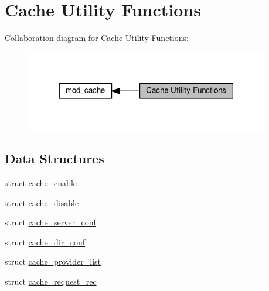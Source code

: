 \hypertarget{group__Cache__util}{}\section{Cache Utility Functions}
\label{group__Cache__util}
Collaboration diagram for Cache Utility Functions\+:
\nopagebreak
\begin{figure}[H]
\begin{center}
\leavevmode
\includegraphics[width=302pt]{group__Cache__util}
\end{center}
\end{figure}
\subsection*{Data Structures}
\begin{DoxyCompactItemize}
\item 
struct \hyperlink{structcache__enable}{cache\+\_\+enable}
\item 
struct \hyperlink{structcache__disable}{cache\+\_\+disable}
\item 
struct \hyperlink{structcache__server__conf}{cache\+\_\+server\+\_\+conf}
\item 
struct \hyperlink{structcache__dir__conf}{cache\+\_\+dir\+\_\+conf}
\item 
struct \hyperlink{structcache__provider__list}{cache\+\_\+provider\+\_\+list}
\item 
struct \hyperlink{structcache__request__rec}{cache\+\_\+request\+\_\+rec}
\end{DoxyCompactItemize}
